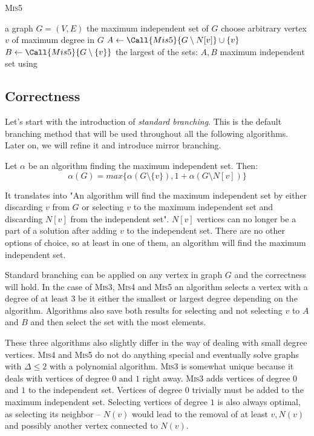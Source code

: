\begin{algorithm}[H]
\caption{\textsc{Mis5}}\label{alg:mis5}
\begin{algorithmic}[1]
\Require a graph $G=(V,E)$
\Ensure the maximum independent set of $G$
        \State choose arbitrary vertex $v$ of maximum degree in $G$
        \State $A \gets \Call{Mis5}{G\setminus N[v]} \cup \{v\}$
        \State $B \gets \Call{Mis5}{G\setminus \{v\}}$
        \State \Return the largest of the sets: $A, B$
    \Else
        \State \Return maximum independent set using 
    \EndIf
\EndProcedure
\end{algorithmic}
\end{algorithm}

\subsection{Correctness}

Let's start with the introduction of \emph{standard branching}. This is the default branching method that will be used throughout all the following algorithms. Later on, we will refine it and introduce mirror branching.
\begin{lemma}
Let $\alpha$ be an algorithm finding the maximum independent set. Then:
$$
\alpha(G) = max\{\alpha(G\setminus \{v\}),1+\alpha(G\setminus N[v])\}
$$
\end{lemma}
It translates into "An algorithm will find the maximum independent set by either discarding $v$ from $G$ or selecting $v$ to the maximum independent set and discarding $N[v]$ from the independent set". $N[v]$ vertices can no longer be a part of a solution after adding $v$ to the independent set. There are no other options of choice, so at least in one of them, an algorithm will find the maximum independent set. 

Standard branching can be applied on any vertex in graph $G$ and the correctness will hold. In the case of \textsc{Mis3}, \textsc{Mis4} and \textsc{Mis5} an algorithm selects a vertex with a degree of at least $3$ be it either the smallest or largest degree depending on the algorithm. Algorithms also save both results for selecting and not selecting $v$ to $A$ and $B$ and then select the set with the most elements. 

These three algorithms also slightly differ in the way of dealing with small degree vertices. \textsc{Mis4} and \textsc{Mis5} do not do anything special and eventually solve graphs with $\Delta \leq 2$ with a polynomial algorithm. \textsc{Mis3} is somewhat unique because it deals with vertices of degree $0$ and $1$ right away. \textsc{Mis3} adds vertices of degree $0$ and $1$ to the independent set. Vertices of degree $0$ trivially must be added to the maximum independent set. Selecting vertices of degree $1$ is also always optimal, as selecting its neighbor -- $N(v)$ would lead to the removal of at least $v, N(v)$ and possibly another vertex connected to $N(v)$. 

